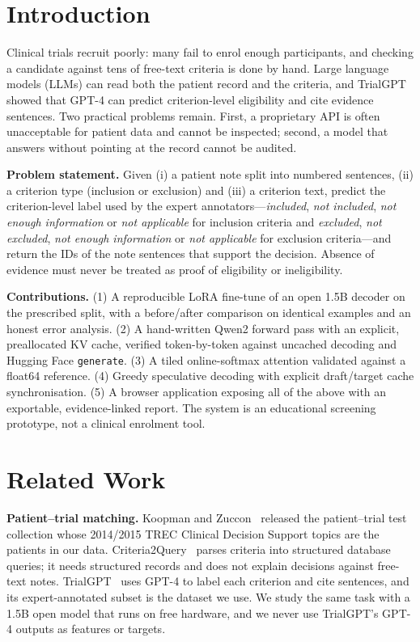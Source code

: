 \documentclass[conference]{IEEEtran}
\begin{document}
\section{Introduction}
Clinical trials recruit poorly: many fail to enrol enough participants, and checking a candidate against tens of free-text criteria is done by hand. Large language models (LLMs) can read both the patient record and the criteria, and TrialGPT~\cite{trialgpt} showed that GPT-4 can predict criterion-level eligibility and cite evidence sentences. Two practical problems remain. First, a proprietary API is often unacceptable for patient data and cannot be inspected; second, a model that answers without pointing at the record cannot be audited.

\textbf{Problem statement.} Given (i) a patient note split into numbered sentences, (ii) a criterion type (inclusion or exclusion) and (iii) a criterion text, predict the criterion-level label used by the expert annotators---\emph{included}, \emph{not included}, \emph{not enough information} or \emph{not applicable} for inclusion criteria and \emph{excluded}, \emph{not excluded}, \emph{not enough information} or \emph{not applicable} for exclusion criteria---and return the IDs of the note sentences that support the decision. Absence of evidence must never be treated as proof of eligibility or ineligibility.

\textbf{Contributions.} (1) A reproducible LoRA fine-tune of an open 1.5B decoder on the prescribed split, with a before/after comparison on identical examples and an honest error analysis. (2) A hand-written Qwen2 forward pass with an explicit, preallocated KV cache, verified token-by-token against uncached decoding and Hugging Face \texttt{generate}. (3) A tiled online-softmax attention validated against a float64 reference. (4) Greedy speculative decoding with explicit draft/target cache synchronisation. (5) A browser application exposing all of the above with an exportable, evidence-linked report. The system is an educational screening prototype, not a clinical enrolment tool.

\section{Related Work}
\textbf{Patient--trial matching.} Koopman and Zuccon~\cite{koopman} released the patient--trial test collection whose 2014/2015 TREC Clinical Decision Support topics are the patients in our data. Criteria2Query~\cite{criteria2query} parses criteria into structured database queries; it needs structured records and does not explain decisions against free-text notes. TrialGPT~\cite{trialgpt} uses GPT-4 to label each criterion and cite sentences, and its expert-annotated subset is the dataset we use. We study the same task with a 1.5B open model that runs on free hardware, and we never use TrialGPT's GPT-4 outputs as features or targets.
\end{document}
